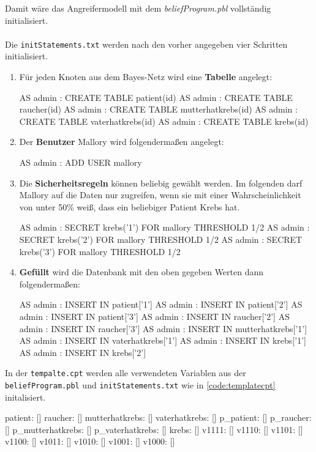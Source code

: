 \documentclass[german,version-2020-11]{uzl-thesis}
\begin{document}
Damit wäre das Angreifermodell mit dem \textit{beliefProgram.pbl} vollständig initialisiert.\\ \\
Die \texttt{initStatements.txt} werden nach den vorher angegeben vier Schritten initialisiert.
\begin{enumerate}
	\item  Für jeden Knoten aus dem Bayes-Netz wird eine \textbf{Tabelle} angelegt: 
\begin{Pseudocode}
AS admin : CREATE TABLE patient(id)
AS admin : CREATE TABLE raucher(id)
AS admin : CREATE TABLE mutterhatkrebs(id)
AS admin : CREATE TABLE vaterhatkrebs(id)
AS admin : CREATE TABLE krebs(id)
\end{Pseudocode}
\item Der \textbf{Benutzer} Mallory wird folgendermaßen angelegt:
\begin{Pseudocode}
AS admin : ADD USER mallory
\end{Pseudocode}
\item Die \textbf{Sicherheitsregeln} können beliebig gewählt werden. Im folgenden darf Mallory auf die Daten nur zugreifen, wenn sie mit einer Wahrscheinlichkeit von unter 50\% weiß, dass ein beliebiger Patient Krebs hat.
\begin{Pseudocode}
AS admin : SECRET krebs('1') FOR mallory THRESHOLD 1/2
AS admin : SECRET krebs('2') FOR mallory THRESHOLD 1/2
AS admin : SECRET krebs('3') FOR mallory THRESHOLD 1/2
\end{Pseudocode}
\item \textbf{Gefüllt} wird die Datenbank mit den oben gegeben Werten dann folgendermaßen:
\begin{Pseudocode}
AS admin : INSERT IN patient['1']
AS admin : INSERT IN patient['2']
AS admin : INSERT IN patient['3']
AS admin : INSERT IN raucher['2']
AS admin : INSERT IN raucher['3']
AS admin : INSERT IN mutterhatkrebs['1']
AS admin : INSERT IN vaterhatkrebs['1']
AS admin : INSERT IN krebs['1']
AS admin : INSERT IN krebs['2']
\end{Pseudocode}
\end{enumerate}
In der  \texttt{tempalte.cpt} werden alle verwendeten Variablen aus der \texttt{beliefProgram.pbl} und \texttt{initStatements.txt} wie in \autoref{code:templatecpt} initalisiert.
\begin{Pseudocode}[caption={\texttt{tempalte.cpt} vom Beispiel} , label = {code:templatecpt} , numbers=left]
patient: []
raucher: []
mutterhatkrebs: []
vaterhatkrebs: []
p_patient: []
p_raucher: []
p_mutterhatkrebs: []
p_vaterhatkrebs: []
krebs: []
v1111: []
v1110: []
v1101: []
v1100: []
v1011: []
v1010: []
v1001: []
v1000: []
\end{Pseudocode}
\end{document}
